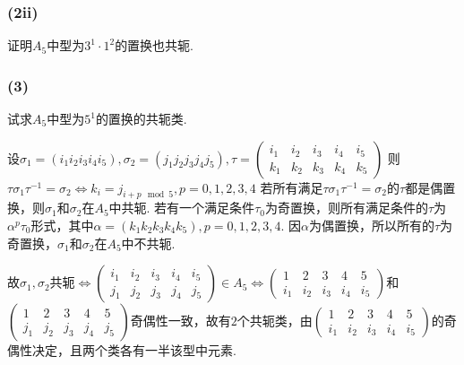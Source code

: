 \subsubsection{(2ii)}
证明$A_5$中型为$3^1\cdot1^2$的置换也共轭.


\subsubsection{(3)}
试求$A_5$中型为$5^1$的置换的共轭类.

\jie
设$\sigma_1=(i_1i_2i_3i_4i_5), \sigma_2=(j_1j_2j_3j_4j_5),\tau=
\begin{pmatrix}
i_1 & i_2 & i_3 & i_4 & i_5\\
k_1 & k_2 & k_3 & k_4 & k_5
\end{pmatrix}$
则$\tau\sigma_1\tau^{-1}=\sigma_2\Leftrightarrow k_i=j_{i+p\mod 5}, p=0,1,2,3,4$
若所有满足$\tau\sigma_1\tau^{-1}=\sigma_2$的$\tau$都是偶置换，则$\sigma_1$和$\sigma_2$在$A_5$中共轭. 若有一个满足条件$\tau_0$为奇置换，则所有满足条件的$\tau$为$\alpha^{p}\tau_0$形式，其中$\alpha=(k_1k_2k_3k_4k_5), p=0,1,2,3,4$. 因$\alpha$为偶置换，所以所有的$\tau$为奇置换，$\sigma_1$和$\sigma_2$在$A_5$中不共轭.

故$\sigma_1,\sigma_2$共轭$\Leftrightarrow
\begin{pmatrix}
i_1 & i_2 & i_3 & i_4 & i_5\\
j_1 & j_2 & j_3 & j_4 & j_5
\end{pmatrix}\in A_5
\Leftrightarrow
\begin{pmatrix}
	1 & 2 & 3 & 4 & 5\\
	i_1 & i_2 & i_3 & i_4 & i_5
\end{pmatrix}
$和
$
\begin{pmatrix}
1 & 2 & 3 & 4 & 5\\
j_1 & j_2 & j_3 & j_4 & j_5
\end{pmatrix}
$奇偶性一致，故有$2$个共轭类，由$
\begin{pmatrix}
1 & 2 & 3 & 4 & 5\\
i_1 & i_2 & i_3 & i_4 & i_5
\end{pmatrix}
$的奇偶性决定，且两个类各有一半该型中元素.

